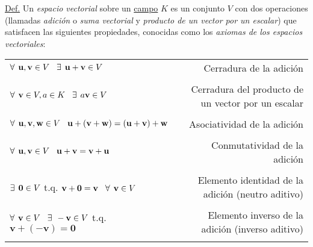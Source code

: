 \documentclass[apuntes]{subfiles}
\begin{document}
\begin{tcolorbox}[breakable]
\underline{Def.} Un \emph{espacio vectorial} sobre un \hyperlink{Sssec: Definición de campo}{campo} $K$ es un conjunto $V$ con dos operaciones (llamadas \emph{adición} o \emph{suma vectorial} y \emph{producto de un vector por un escalar}) que satisfacen las siguientes propiedades, conocidas como los \emph{axiomas de los espacios vectoriales}:

\begin{center}
\begin{tabular}{lr}
    $\forall\hspace{1.5mm} \mathbf{u},\mathbf{v}\in V \hspace{3mm}\exists \hspace{1.5mm} \mathbf{u}+\mathbf{v}\in V$ & Cerradura de la adición \\ \\ \multirow{2}{0.4\textwidth}{$\forall\hspace{1.5mm} \mathbf{v}\in V, a\in K \hspace{3mm}\exists \hspace{1.5mm} a\mathbf{v}\in V$} & \multirow{2}{0.28\textwidth}{Cerradura del producto de un vector por un escalar} \\ \\ \\
    $\forall\hspace{1.5mm} \mathbf{u},\mathbf{v},\mathbf{w}\in V\hspace{3mm}\mathbf{u}+(\mathbf{v}+\mathbf{w})=(\mathbf{u}+\mathbf{v})+\mathbf{w}$  & Asociatividad de la adición\\ \\
    $\forall\hspace{1.5mm} \mathbf{u},\mathbf{v}\in V\hspace{3mm}\mathbf{u}+\mathbf{v}=\mathbf{v}+\mathbf{u}$ & Conmutatividad de la adición \\ \\
    $\exists \hspace{1.5mm} \mathbf{0}\in V$ t.q. $\mathbf{v}+\mathbf{0}=\mathbf{v}\hspace{3mm}\forall\hspace{1.5mm} \mathbf{v} \in V$ & Elemento identidad de la adición (neutro aditivo) \\ \\
    $\forall\hspace{1.5mm}\mathbf{v}\in V \hspace{3mm}\exists\hspace{1.5mm} -\mathbf{v}\in V$ t.q. $\mathbf{v}+(-\mathbf{v})=\mathbf{0}$ & Elemento inverso de la adición (inverso aditivo) \\ \\

\end{tabular}
\end{center}
\end{tcolorbox}
\end{document}
